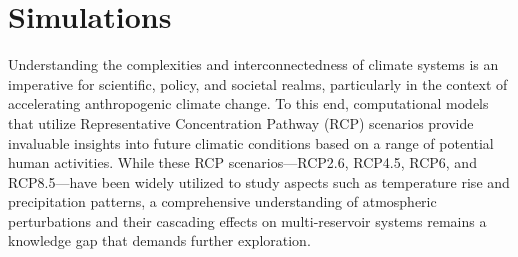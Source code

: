 \documentclass[11pt, a4paper, pdftex, twoside, dvipsnames]{article}
\begin{document}
 \section{Simulations}
 
 Understanding the complexities and interconnectedness of climate systems is an imperative for scientific, policy, and societal realms, particularly in the context of accelerating anthropogenic climate change. 
 To this end, computational models that utilize Representative Concentration Pathway (RCP) scenarios provide invaluable insights into future climatic conditions based on a range of potential human activities. 
 While these RCP scenarios---RCP2.6, RCP4.5, RCP6, and RCP8.5—have been widely utilized to study aspects such as temperature rise and precipitation patterns, a comprehensive understanding of atmospheric perturbations and their cascading effects on multi-reservoir systems remains a knowledge gap that demands further exploration.
 
\end{document}
